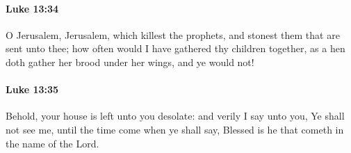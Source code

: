 		\paragraph{Luke 13:34} %
			\label{LUKE-13-34}

			O Jerusalem, Jerusalem, which killest the prophets, and stonest them that are sent unto thee; how often would I have gathered thy children together, as a hen doth gather her brood under her wings, and ye would not!

			\begin{framed}
			\scriptsize
				\begin{compactdesc}
					\item[SBLG] 
				\end{compactdesc}
			\end{framed}

		\paragraph{Luke 13:35} %
			\label{LUKE-13-35}

			Behold, your house is left unto you desolate: and verily I say unto you, Ye shall not see me, until the time come when ye shall say, Blessed is he that cometh in the name of the Lord.


